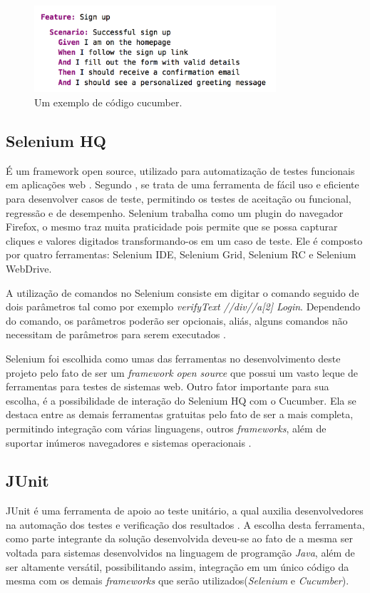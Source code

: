 \documentclass[tg]{mdtufsm}
\begin{document}
\begin{figure}[!htb]
    \centering
    \includegraphics[width=0.8\textwidth]{codigo_cucumber}
    \caption{Um exemplo de código cucumber.}
    \label{fig:codigo_cucumber}
\end{figure}

\subsection{Selenium HQ}
É um framework open source, utilizado para automatização de testes funcionais em aplicações web \cite{chiavegatto1desenvolvimento}. Segundo \citeauthor{pereiraestudoselenium} \cite{pereiraestudoselenium}, se trata
de uma ferramenta de fácil uso e eficiente para desenvolver casos de teste, permitindo os testes de aceitação ou funcional, regressão e de desempenho.
Selenium trabalha como um plugin do navegador Firefox, o mesmo traz muita praticidade pois permite que se possa capturar cliques e valores digitados transformando-os em um caso de teste. Ele é composto por
quatro ferramentas: Selenium IDE, Selenium Grid, Selenium RC e Selenium WebDrive.

A  utilização  de  comandos  no  Selenium  consiste  em  digitar  o  comando  seguido  de  dois parâmetros  tal  como  por  exemplo \emph{verifyText //div//a[2] Login}. Dependendo  do  comando,  os parâmetros
poderão ser opcionais, aliás, alguns comandos não necessitam de parâmetros para serem executados \cite{sixpenceautomatizaccao}.

Selenium foi escolhida como umas das ferramentas no desenvolvimento deste projeto pelo fato de ser um \emph{framework open source} que possui um vasto leque de ferramentas para testes de sistemas web. Outro fator
importante para sua escolha, é a possibilidade de interação do Selenium HQ com o Cucumber. Ela  se  destaca  entre  as demais ferramentas  gratuitas pelo fato de ser a mais completa, permitindo integração com
várias linguagens,  outros \emph{frameworks}, além de suportar inúmeros navegadores e sistemas operacionais \cite{pereiraestudoselenium}.

\subsection{JUnit}
JUnit é uma ferramenta de apoio ao teste unitário, a qual auxilia desenvolvedores na automação dos testes e verificação dos resultados \cite{biasi2006geraccao}. A escolha desta ferramenta, como parte integrante da solução desenvolvida deveu-se ao fato de a mesma ser voltada para sistemas desenvolvidos na linguagem de programção \emph{Java}, além de ser altamente versátil, possibilitando assim, integração em um único código da mesma com os demais \emph{frameworks} que serão utilizados(\emph{Selenium} e \emph{Cucumber}).
\end{document}
